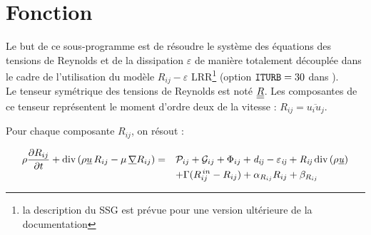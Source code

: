 
%
%
%
%


\label{ap:turrij}
\vspace{1cm}
\section*{Fonction}
Le but de ce sous-programme est de r\'esoudre le syst\`eme des \'equations des
tensions de Reynolds et de la dissipation $\varepsilon$ de mani\`ere totalement d\'ecoupl\'ee dans le cadre de l'utilisation du mod\`ele $R_{ij}-\varepsilon$  LRR\footnote{la description du SSG est pr\'evue pour une version ult\'erieure de la documentation} (option $\text{\texttt{ITURB}}=30$ dans ).\\
Le tenseur sym\'etrique des tensions de Reynolds est not\'e $\underline{\underline{R}}$. Les composantes de ce tenseur repr\'esentent le moment d'ordre deux de la vitesse : $R_{ij} = \overline{u_iu_j}$.

Pour chaque composante $R_{ij}$, on r\'esout :

\begin{equation}
\begin{array}{ll}
\displaystyle
\rho\frac{\partial R_{ij}}{\partial t} +
\text{div}\,(\rho \underline{u}\,R_{ij} - \mu\,\underline{\nabla}{R_{ij}}) = &
\mathcal{P}_{ij} + \mathcal{G}_{ij}+\Phi_{ij} + \it{d}_{ij} - \varepsilon_{ij} +
R_{ij}\,\text{div}\,{(\rho \underline{u})} \\
& \displaystyle + \Gamma(R^{\,in}_{ij}-R_{ij}) + \alpha_{R_{ij}} R_{ij} + \beta_{R_{ij}}
\end{array}
\end{equation}

